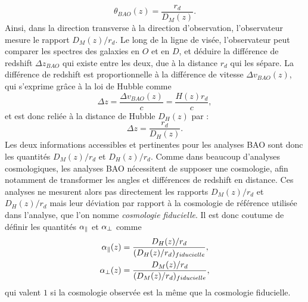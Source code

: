 \documentclass[11pt, twoside, a4paper, openright]{report}
\begin{document}
\begin{equation}
  \label{eq:theta_bao}
  \theta_{BAO}(z) = \frac{r_d}{D_M(z)}.
\end{equation}
Ainsi, dans la direction transverse à la direction d'observation, l'observateur mesure le rapport $D_M(z) / r_d$. Le long de la ligne de visée, l'observateur peut comparer les spectres des galaxies en $O$ et en $D$, et déduire la différence de redshift $\Delta z_{BAO}$ qui existe entre les deux, due à la distance $r_d$ qui les sépare. La différence de redshift est proportionnelle à la différence de vitesse $\Delta v_{BAO}(z)$, qui s'exprime grâce à la loi de Hubble comme
\begin{equation}
  \label{eq:v_bao}
\Delta z =  \frac{\Delta v_{BAO}(z)}{c} = \frac{H(z) r_d}{c} ,
\end{equation}
et est donc reliée à la distance de Hubble $D_H(z)$ par :
\begin{equation}
  \label{eq:v_bao2}
  \Delta z = \frac{r_d }{D_H(z)}.
\end{equation}
Les deux informations accessibles et pertinentes pour les analyses BAO sont donc les quantités $D_M(z) / r_d$ et $D_H(z) / r_d$. Comme dans beaucoup d'analyses cosmologiques, les analyses BAO nécessitent de supposer une cosmologie, afin notamment de transformer les angles et différences de redshift en distance. Ces analyses ne mesurent alors pas directement les rapports  $D_M(z) / r_d$ et $D_H(z) / r_d$ mais leur déviation par rapport à la cosmologie de référence utilisée dans l'analyse, que l'on nomme \emph{cosmologie fiducielle}. Il est donc coutume de définir les quantités $\alpha_{\parallel}{}$ et $\alpha_{\perp}{}$ comme
\begin{align}
  \label{eq:apar}
  \alpha_{\parallel}{}(z) &= \frac{D_H(z) / r_d}{(D_H(z) / r_d)_{fiducielle}} , \\
  \label{eq:aperp}
  \alpha_{\perp}{}(z) &= \frac{D_M(z) / r_d}{(D_M(z) / r_d)_{fiducielle}} ,
\end{align}
qui valent $1$ si la cosmologie observée est la même que la cosmologie fiducielle.
\end{document}
